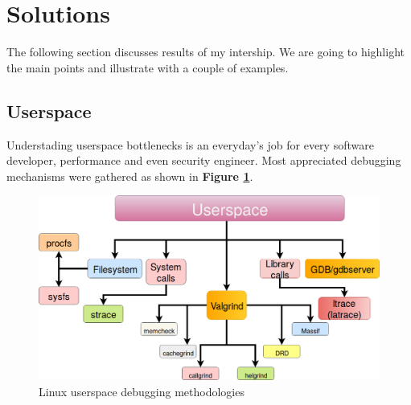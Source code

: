 \section{Solutions}
The following section discusses results of my intership. We are going to highlight the main points and illustrate with a couple of examples.


\begin{center}
\end{center}



\subsection{Userspace}
Understading userspace bottlenecks is an everyday's job for every software developer, performance and even security engineer. Most appreciated debugging mechanisms were gathered as shown in \textbf{Figure \ref{Linux userspace debugging methodologies}}.
\begin{figure}[H]
		\centering
        \includegraphics[scale=0.40]{img/solution/userspace.png}
        \caption{Linux userspace debugging methodologies}
        \label{Linux userspace debugging methodologies}
    \end{figure}
    
